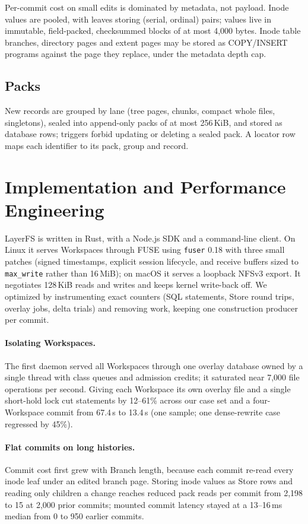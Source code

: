 \documentclass[letterpaper,twocolumn,10pt]{article}
\newcommand{\sys}{LayerFS}
\newcommand{\ws}{Workspace}
\begin{document}
Per-commit cost on small edits is dominated by metadata, not payload. Inode
values are pooled, with leaves storing (serial, ordinal) pairs; values live
in immutable, field-packed, checksummed blocks of at most 4,000 bytes. Inode
table branches, directory pages and extent pages may be stored as
COPY/INSERT programs against the page they replace, under the metadata depth
cap.

\subsection{Packs}

New records are grouped by lane (tree pages, chunks, compact whole files,
singletons), sealed into append-only packs of at most 256\,KiB, and stored as
database rows; triggers forbid updating or deleting a sealed pack. A locator
row maps each identifier to its pack, group and record.

\section{Implementation and Performance Engineering}
\label{sec:impl}

\sys{} is written in Rust, with a Node.js SDK and a command-line client.
On Linux it serves \ws{}s through FUSE using \texttt{fuser} 0.18 with three
small patches (signed timestamps, explicit session lifecycle, and receive
buffers sized to \texttt{max\_write} rather than 16\,MiB); on macOS it serves
a loopback NFSv3 export. It negotiates 128\,KiB reads and writes and keeps
kernel write-back off. We optimized by instrumenting exact counters (SQL
statements, Store round trips, overlay jobs, delta trials) and removing
work, keeping one construction producer per commit.

\paragraph{Isolating \ws{}s.} The first daemon served all \ws{}s through one
overlay database owned by a single thread with class queues and admission
credits; it saturated near 7,000 file operations per second. Giving each
\ws{} its own overlay file and a single short-hold lock cut statements by
12--61\% across our case set and a four-\ws{} commit from 67.4\,s to 13.4\,s
(one sample; one dense-rewrite case regressed by 45\%).

\paragraph{Flat commits on long histories.} Commit cost first grew with
Branch length, because each commit re-read every inode leaf under an edited
branch page. Storing inode values as Store rows and reading only children a
change reaches reduced pack reads per commit from 2,198 to 15 at 2,000 prior
commits; mounted commit latency stayed at a 13--16\,ms median from 0 to 950
earlier commits.
\end{document}
